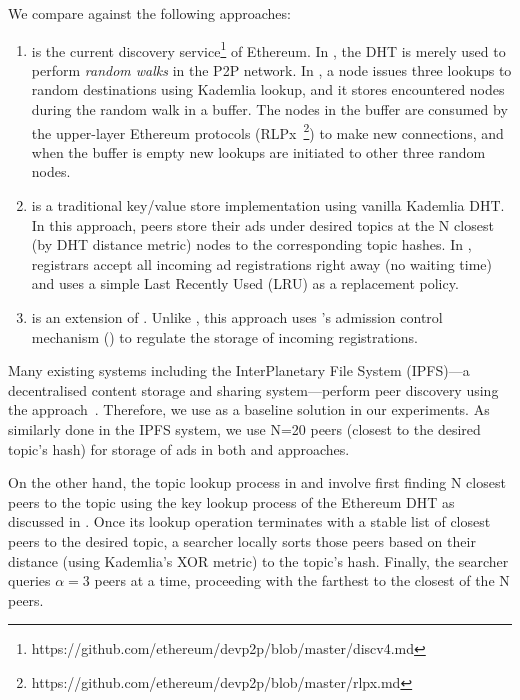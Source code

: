We compare \sysname against the following approaches:
\begin{enumerate}
\item \discv is the current discovery service\footnote{https://github.com/ethereum/devp2p/blob/master/discv4.md} of Ethereum. In \discv, the DHT is merely used to perform \emph{random walks} in the P2P network. 
In \discv, a node issues three lookups to random destinations using  Kademlia lookup,  and it stores encountered nodes during the random walk in a buffer. The nodes in the buffer are consumed by the upper-layer Ethereum protocols (\eg RLPx~\footnote{https://github.com/ethereum/devp2p/blob/master/rlpx.md}) to make new connections, and when the buffer is empty new lookups are initiated to other three random nodes.
\item \altname is a traditional key/value store implementation using vanilla Kademlia DHT. 
In this approach, peers store their ads under desired topics at the N closest (by DHT distance metric) nodes to the corresponding topic hashes. In \altname, registrars accept all incoming ad registrations right away (\ie no waiting time) and uses a simple Last Recently Used (LRU) as a replacement policy.
\item \altnameticket is an extension of \altname. Unlike \altname, this approach uses \sysname's admission control mechanism () to regulate the storage of incoming registrations. 
\end{enumerate}



Many existing systems including the InterPlanetary File System (IPFS)---a decentralised content storage and sharing system---perform peer discovery using the \altname approach~\cite{libp2p_kaddht}. Therefore, we use \altname as a baseline solution in our experiments. 
As similarly done in the IPFS system, we use N=20 peers (\ie closest to the desired topic's hash) for storage of ads in both \altname and \altnameticket approaches.

On the other hand, the topic lookup process in \altname and \altnameticket involve first finding N closest peers to the topic using the key lookup process of the Ethereum DHT as discussed in . Once its lookup operation terminates with a stable list of closest peers to the desired topic, a searcher locally sorts those peers based on their distance (using Kademlia's XOR metric) to the topic's hash. Finally, the searcher queries $\alpha=3$ peers at a time, proceeding with the farthest to the closest of the N peers.

